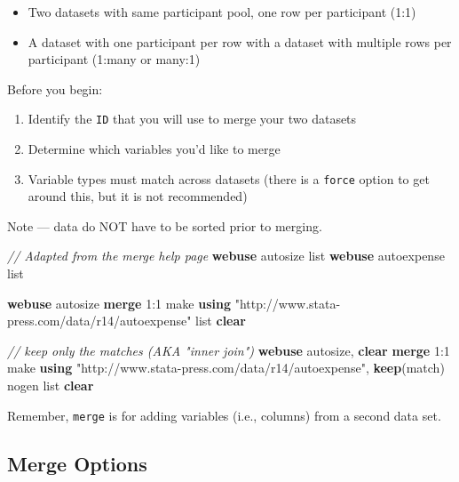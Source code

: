 \documentclass[
]{book}
\newenvironment{Shaded}{\begin{snugshade}}{\end{snugshade}}
\newcommand{\CommentTok}[1]{\textcolor[rgb]{0.56,0.35,0.01}{\textit{#1}}}
\newcommand{\FunctionTok}[1]{\textcolor[rgb]{0.00,0.00,0.00}{#1}}
\newcommand{\KeywordTok}[1]{\textcolor[rgb]{0.13,0.29,0.53}{\textbf{#1}}}
\newcommand{\NormalTok}[1]{#1}
\newcommand{\OtherTok}[1]{\textcolor[rgb]{0.56,0.35,0.01}{#1}}
\newcommand{\StringTok}[1]{\textcolor[rgb]{0.31,0.60,0.02}{#1}}
\providecommand{\tightlist}{%
  \setlength{\itemsep}{0pt}\setlength{\parskip}{0pt}}
\begin{document}
\begin{itemize}
\tightlist
\item
  Two datasets with same participant pool, one row per participant (1:1)
\item
  A dataset with one participant per row with a dataset with multiple rows per participant (1:many or many:1)
\end{itemize}

Before you begin:

\begin{enumerate}
\def\labelenumi{\arabic{enumi}.}
\tightlist
\item
  Identify the \texttt{ID} that you will use to merge your two datasets
\item
  Determine which variables you'd like to merge
\item
  Variable types must match across datasets (there is a \texttt{force} option to get around this, but it is not recommended)
\end{enumerate}

Note --- data do NOT have to be sorted prior to merging.

\begin{Shaded}
\begin{Highlighting}[]
\CommentTok{// Adapted from the merge help page}
\KeywordTok{webuse}\NormalTok{ autosize }
\OtherTok{list}
\KeywordTok{webuse}\NormalTok{ autoexpense}
\OtherTok{list}

\KeywordTok{webuse}\NormalTok{ autosize}
\KeywordTok{merge}\NormalTok{ 1:1 make }\KeywordTok{using} \StringTok{"http://www.stata{-}press.com/data/r14/autoexpense"}
\OtherTok{list}
\KeywordTok{clear}

\CommentTok{// keep only the matches (AKA "inner join")}
\KeywordTok{webuse}\NormalTok{ autosize, }\KeywordTok{clear}
\KeywordTok{merge}\NormalTok{ 1:1 make }\KeywordTok{using} \StringTok{"http://www.stata{-}press.com/data/r14/autoexpense"}\NormalTok{, }\KeywordTok{keep}\NormalTok{(}\FunctionTok{match}\NormalTok{) nogen}
\OtherTok{list}
\KeywordTok{clear}
\end{Highlighting}
\end{Shaded}

Remember, \texttt{merge} is for adding variables (i.e., columns) from a second data set.

\hypertarget{merge-options}{%
\subsection{Merge Options}\label{merge-options}}
\end{document}
